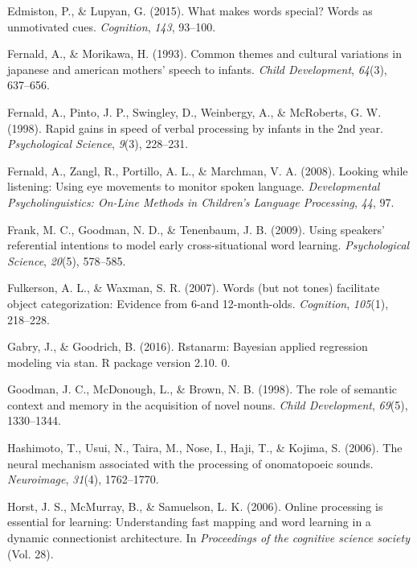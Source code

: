 \documentclass[english,floatsintext,man]{apa6}
\theoremstyle{definition}
\theoremstyle{definition}
\theoremstyle{definition}
\theoremstyle{remark}
\begin{document}
\leavevmode\hypertarget{ref-edmiston2015makes}{}%
Edmiston, P., \& Lupyan, G. (2015). What makes words special? Words as
unmotivated cues. \emph{Cognition}, \emph{143}, 93--100.

\leavevmode\hypertarget{ref-fernald1993common}{}%
Fernald, A., \& Morikawa, H. (1993). Common themes and cultural
variations in japanese and american mothers' speech to infants.
\emph{Child Development}, \emph{64}(3), 637--656.

\leavevmode\hypertarget{ref-fernald1998rapid}{}%
Fernald, A., Pinto, J. P., Swingley, D., Weinbergy, A., \& McRoberts, G.
W. (1998). Rapid gains in speed of verbal processing by infants in the
2nd year. \emph{Psychological Science}, \emph{9}(3), 228--231.

\leavevmode\hypertarget{ref-fernald2008looking}{}%
Fernald, A., Zangl, R., Portillo, A. L., \& Marchman, V. A. (2008).
Looking while listening: Using eye movements to monitor spoken language.
\emph{Developmental Psycholinguistics: On-Line Methods in Children's
Language Processing}, \emph{44}, 97.

\leavevmode\hypertarget{ref-frank2009using}{}%
Frank, M. C., Goodman, N. D., \& Tenenbaum, J. B. (2009). Using
speakers' referential intentions to model early cross-situational word
learning. \emph{Psychological Science}, \emph{20}(5), 578--585.

\leavevmode\hypertarget{ref-fulkerson2007words}{}%
Fulkerson, A. L., \& Waxman, S. R. (2007). Words (but not tones)
facilitate object categorization: Evidence from 6-and 12-month-olds.
\emph{Cognition}, \emph{105}(1), 218--228.

\leavevmode\hypertarget{ref-gabry2016rstanarm}{}%
Gabry, J., \& Goodrich, B. (2016). Rstanarm: Bayesian applied regression
modeling via stan. R package version 2.10. 0.

\leavevmode\hypertarget{ref-goodman1998role}{}%
Goodman, J. C., McDonough, L., \& Brown, N. B. (1998). The role of
semantic context and memory in the acquisition of novel nouns.
\emph{Child Development}, \emph{69}(5), 1330--1344.

\leavevmode\hypertarget{ref-hashimoto2006neural}{}%
Hashimoto, T., Usui, N., Taira, M., Nose, I., Haji, T., \& Kojima, S.
(2006). The neural mechanism associated with the processing of
onomatopoeic sounds. \emph{Neuroimage}, \emph{31}(4), 1762--1770.

\leavevmode\hypertarget{ref-horst2006online}{}%
Horst, J. S., McMurray, B., \& Samuelson, L. K. (2006). Online
processing is essential for learning: Understanding fast mapping and
word learning in a dynamic connectionist architecture. In
\emph{Proceedings of the cognitive science society} (Vol. 28).
\end{document}
